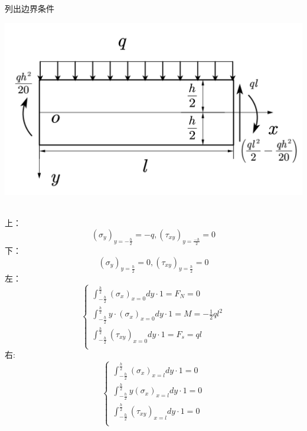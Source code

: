 \begin{example}
	列出边界条件
\end{example}
\centerline{\includegraphics[scale=0.5]{figure/2-13.png}}
	\begin{remark}
		\quad\\
		上：\[\left( \sigma _y \right) _{y=-\frac{h}{2}}=-q,\left( \tau _{xy} \right) _{y=\frac{-h}{2}}=0\]
		下：\[\left( \sigma _y \right) _{y=\frac{h}{2}}=0,\left( \tau _{xy} \right) _{y=\frac{h}{2}}=0\]
		左：\[\begin{cases}
		\int_{-\frac{h}{2}}^{\frac{h}{2}}{\left( \sigma _x \right) _{x=0}dy\cdot 1}=F_N=0\\
		\int_{-\frac{h}{2}}^{\frac{h}{2}}{y\cdot \left( \sigma _x \right) _{x=0}dy\cdot 1}=M=-\frac{1}{2}ql^2\\
		\int_{-\frac{h}{2}}^{\frac{h}{2}}{\left( \tau _{xy} \right) _{x=0}dy\cdot 1}=F_s=ql\\
		\end{cases}\]
		右:\[\begin{cases}
		\int_{-\frac{h}{2}}^{\frac{h}{2}}{\left( \sigma _x \right) _{x=l}dy\cdot 1}=0\\
		\int_{-\frac{h}{2}}^{\frac{h}{2}}{y\left( \sigma _x \right) _{x=l}dy\cdot 1=0}\\
		\int_{-\frac{h}{2}}^{\frac{h}{2}}{\left( \tau _{xy} \right) _{x=l}dy\cdot 1}=0\\
		\end{cases}\]
	\end{remark}

